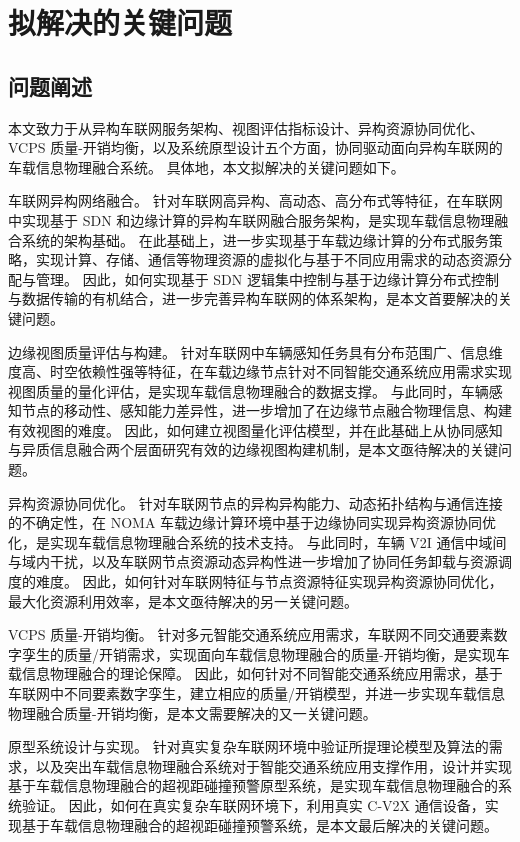 \section{拟解决的关键问题}\label{section 1-5}

\subsection{问题阐述}

本文致力于从异构车联网服务架构、视图评估指标设计、异构资源协同优化、VCPS 质量-开销均衡，以及系统原型设计五个方面，协同驱动面向异构车联网的车载信息物理融合系统。
具体地，本文拟解决的关键问题如下。

 车联网异构网络融合。
针对车联网高异构、高动态、高分布式等特征，在车联网中实现基于 SDN 和边缘计算的异构车联网融合服务架构，是实现车载信息物理融合系统的架构基础。
在此基础上，进一步实现基于车载边缘计算的分布式服务策略，实现计算、存储、通信等物理资源的虚拟化与基于不同应用需求的动态资源分配与管理。
因此，如何实现基于 SDN 逻辑集中控制与基于边缘计算分布式控制与数据传输的有机结合，进一步完善异构车联网的体系架构，是本文首要解决的关键问题。

 边缘视图质量评估与构建。
针对车联网中车辆感知任务具有分布范围广、信息维度高、时空依赖性强等特征，在车载边缘节点针对不同智能交通系统应用需求实现视图质量的量化评估，是实现车载信息物理融合的数据支撑。
与此同时，车辆感知节点的移动性、感知能力差异性，进一步增加了在边缘节点融合物理信息、构建有效视图的难度。
因此，如何建立视图量化评估模型，并在此基础上从协同感知与异质信息融合两个层面研究有效的边缘视图构建机制，是本文亟待解决的关键问题。

 异构资源协同优化。
针对车联网节点的异构异构能力、动态拓扑结构与通信连接的不确定性，在 NOMA 车载边缘计算环境中基于边缘协同实现异构资源协同优化，是实现车载信息物理融合系统的技术支持。
与此同时，车辆 V2I 通信中域间与域内干扰，以及车联网节点资源动态异构性进一步增加了协同任务卸载与资源调度的难度。
因此，如何针对车联网特征与节点资源特征实现异构资源协同优化，最大化资源利用效率，是本文亟待解决的另一关键问题。

 VCPS 质量-开销均衡。
针对多元智能交通系统应用需求，车联网不同交通要素数字孪生的质量/开销需求，实现面向车载信息物理融合的质量-开销均衡，是实现车载信息物理融合的理论保障。
因此，如何针对不同智能交通系统应用需求，基于车联网中不同要素数字孪生，建立相应的质量/开销模型，并进一步实现车载信息物理融合质量-开销均衡，是本文需要解决的又一关键问题。

 原型系统设计与实现。
针对真实复杂车联网环境中验证所提理论模型及算法的需求，以及突出车载信息物理融合系统对于智能交通系统应用支撑作用，设计并实现基于车载信息物理融合的超视距碰撞预警原型系统，是实现车载信息物理融合的系统验证。
因此，如何在真实复杂车联网环境下，利用真实 C-V2X 通信设备，实现基于车载信息物理融合的超视距碰撞预警系统，是本文最后解决的关键问题。

